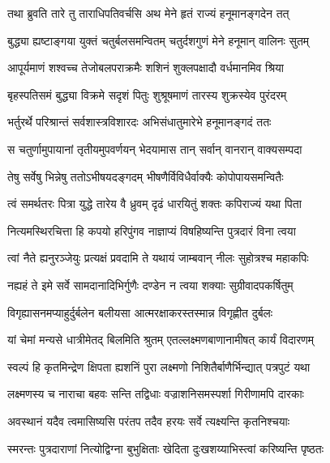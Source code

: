 
\twolineshloka
{तथा ब्रुवति तारे तु ताराधिपतिवर्चसि}
{अथ मेने हृतं राज्यं हनूमानङ्गदेन तत्} %

\twolineshloka
{बुद्ध्या ह्यष्टाङ्गया युक्तं चतुर्बलसमन्वितम्}
{चतुर्दशगुणं मेने हनूमान् वालिनः सुतम्} %

\twolineshloka
{आपूर्यमाणं शश्वच्च तेजोबलपराक्रमैः}
{शशिनं शुक्लपक्षादौ वर्धमानमिव श्रिया} %

\twolineshloka
{बृहस्पतिसमं बुद्ध्या विक्रमे सदृशं पितुः}
{शुश्रूषमाणं तारस्य शुक्रस्येव पुरंदरम्} %

\twolineshloka
{भर्तुरर्थे परिश्रान्तं सर्वशास्त्रविशारदः}
{अभिसंधातुमारेभे हनूमानङ्गदं ततः} %

\twolineshloka
{स चतुर्णामुपायानां तृतीयमुपवर्णयन्}
{भेदयामास तान् सर्वान् वानरान् वाक्यसम्पदा} %

\twolineshloka
{तेषु सर्वेषु भिन्नेषु ततोऽभीषयदङ्गदम्}
{भीषणैर्विविधैर्वाक्यैः कोपोपायसमन्वितैः} %

\twolineshloka
{त्वं समर्थतरः पित्रा युद्धे तारेय वै ध्रुवम्}
{दृढं धारयितुं शक्तः कपिराज्यं यथा पिता} %

\twolineshloka
{नित्यमस्थिरचित्ता हि कपयो हरिपुंगव}
{नाज्ञाप्यं विषहिष्यन्ति पुत्रदारं विना त्वया} %

\twolineshloka
{त्वां नैते ह्यनुरञ्जेयुः प्रत्यक्षं प्रवदामि ते}
{यथायं जाम्बवान् नीलः सुहोत्रश्च महाकपिः} %

\twolineshloka
{नह्यहं ते इमे सर्वे सामदानादिभिर्गुणैः}
{दण्डेन न त्वया शक्याः सुग्रीवादपकर्षितुम्} %

\twolineshloka
{विगृह्यासनमप्याहुर्दुर्बलेन बलीयसा}
{आत्मरक्षाकरस्तस्मान्न विगृह्णीत दुर्बलः} %

\twolineshloka
{यां चेमां मन्यसे धात्रीमेतद् बिलमिति श्रुतम्}
{एतल्लक्ष्मणबाणानामीषत् कार्यं विदारणम्} %

\twolineshloka
{स्वल्पं हि कृतमिन्द्रेण क्षिपता ह्यशनिं पुरा}
{लक्ष्मणो निशितैर्बाणैर्भिन्द्यात् पत्रपुटं यथा} %

\twolineshloka
{लक्ष्मणस्य च नाराचा बहवः सन्ति तद्विधाः}
{वज्राशनिसमस्पर्शा गिरीणामपि दारकाः} %

\twolineshloka
{अवस्थानं यदैव त्वमासिष्यसि परंतप}
{तदैव हरयः सर्वे त्यक्ष्यन्ति कृतनिश्चयाः} %

\twolineshloka
{स्मरन्तः पुत्रदाराणां नित्योद्विग्ना बुभुक्षिताः}
{खेदिता दुःखशय्याभिस्त्वां करिष्यन्ति पृष्ठतः} %

